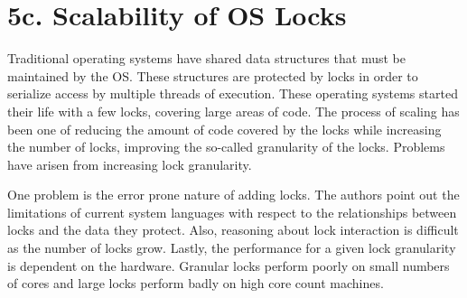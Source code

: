 \documentclass[12pt]{article}
\begin{document}
\section*{5c. Scalability of OS Locks}
Traditional operating systems have shared data structures that must be
maintained by the OS.  These structures are protected by locks in
order to serialize access by multiple threads of execution.  These
operating systems started their life with a few locks, covering large
areas of code.  The process of scaling has been one of reducing the
amount of code covered by the locks while increasing the number of
locks, improving the so-called granularity of the locks.  Problems
have arisen from increasing lock granularity.

One problem is the error prone nature of adding locks.  The authors
point out the limitations of current system languages with respect to
the relationships between locks and the data they protect.  Also,
reasoning about lock interaction is difficult as the number of locks
grow.  Lastly, the performance for a given lock granularity is
dependent on the hardware.  Granular locks perform poorly on small
numbers of cores and large locks perform badly on high core count
machines.




\end{document}
